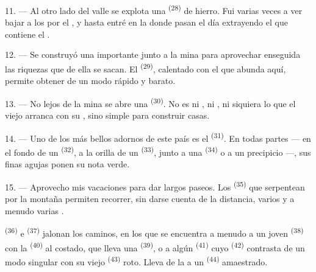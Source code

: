 11. --- Al otro lado del valle se explota una  \textsuperscript{(28)} de
hierro. Fui varias veces a ver bajar a los  por el
, y hasta entré en la  donde pasan el día
extrayendo el  que contiene el .

12. --- Se construyó una importante  junto a la mina para
aprovechar enseguida las riquezas que de ella se sacan. El  \textsuperscript{(29)}, calentado con el  que
abunda aquí, permite obtener  de un modo rápido y
barato.

13. --- No lejos de la mina se abre una  \textsuperscript{(30)}. No es
ni , ni , ni siquiera  lo que
el viejo  arranca con su , sino simple
 para construir casas.

14. --- Uno de los más bellos adornos de este país es el 
\textsuperscript{(31)}. En todas partes --- en el fondo de un 
\textsuperscript{(32)}, a la orilla de un  \textsuperscript{(33)}, junto a
una  \textsuperscript{(34)} o a un precipicio ---, sus finas agujas
ponen su nota verde.

\VUsaut{3.0mm}
\VUsaut{3.0mm}

15. --- Aprovecho mis vacaciones para dar largos paseos. Los
 \textsuperscript{(35)} que serpentean por la montaña permiten
recorrer, sin darse cuenta de la distancia, varios  y a
menudo varias .

 \textsuperscript{(36)} e  \textsuperscript{(37)} jalonan
los caminos, en los que se encuentra a menudo a un joven
 \textsuperscript{(38)} con la  \textsuperscript{(40)} al
costado, que lleva una  \textsuperscript{(39)}, o a algún
 \textsuperscript{(41)} cuyo  \textsuperscript{(42)}
contrasta de un modo singular con su viejo 
\textsuperscript{(43)} roto. Lleva de la  a un 
\textsuperscript{(44)} amaestrado.

\VUsaut{3.0mm}

